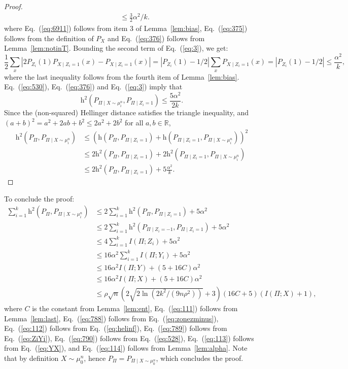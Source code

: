 \documentclass[final, 12pt]{colt2018}
\providecommand{\helli}{\mathrm{h}}
\renewcommand{\eqref}[1]{Eq.~(\ref{#1})}
\begin{document}
\begin{proof}
\begin{align}
&\le \frac{3}{2} \alpha^2 / k. \label{eq:376} 
\end{align}
where \eqref{eq:6911} follows from item 3 of Lemma~\ref{lem:bias}, \eqref{eq:375} follows from the definition of $P_X$ and \eqref{eq:376} follows from Lemma~\ref{lem:notinT}. Bounding the second term of \eqref{eq:3}, we get:
\begin{equation} \label{eq:530}
\frac{1}{2} \sum_{x} \left\lvert 2 P_{Z_i}(1) P_{X \mid Z_i = 1}(x) - P_{X \mid Z_i = 1}(x) \right\rvert
=\left\lvert P_{Z_i}(1)  - 1/2 \right\rvert \sum_{x} P_{X \mid Z_i = 1}(x)
=\left\lvert P_{Z_i}(1)  - 1/2 \right\rvert
\le \frac{\alpha^2}{k},
\end{equation}
where the last inequality follows from the fourth item of Lemma~\ref{lem:bias}. \eqref{eq:530}, \eqref{eq:376}  and \eqref{eq:3} imply that
\[
\helli^2\left( P_{\Pi \mid X \sim \mu_i^n}, P_{\Pi \mid Z_i = 1} \right) \le \frac{5\alpha^2}{2k}.
\]
Since the (non-squared) Hellinger distance satisfies the triangle inequality, and $(a+b)^2 = a^2 +2ab+ b^2 \le 2a^2 + 2b^2$ for all $a,b \in \mathbb{R}$,
\begin{align*}
\helli^2(P_{\Pi}, P_{\Pi \mid X \sim \mu_i^n})
&\le \left( \helli(P_{\Pi}, P_{\Pi \mid Z_i=1}) + 
\helli(P_{\Pi \mid Z_i = 1}, P_{\Pi \mid X \sim \mu_i^n}) \right)^2 \\
&\le 2 \helli^2(P_{\Pi}, P_{\Pi \mid Z_i=1}) 
+ 2 \helli^2(P_{\Pi \mid Z_i = 1}, P_{\Pi \mid X \sim \mu_i^n})\\
&\le 2 \helli^2(P_{\Pi}, P_{\Pi \mid Z_i=1}) 
+ 5 \frac{\alpha^2}{k}.
\end{align*}
\end{proof}

To conclude the proof:
\begin{align}
\sum_{i=1}^k \helli^2\left( P_{\Pi}, P_{\Pi \mid X \sim \mu_i^n} \right) 
&\le 2 \sum_{i=1}^k \helli^2\left( P_{\Pi}, P_{\Pi \mid Z_i=1} \right) + 5 \alpha^2 \label{eq:111} \\
&\le 2 \sum_{i=1}^k \helli^2(P_{\Pi \mid Z_i=-1}, P_{\Pi \mid Z_i=1}) + 5 \alpha^2 \label{eq:788} \\
&\le 4\sum_{i=1}^k I(\Pi; Z_i) + 5 \alpha^2 \label{eq:112} \\
&\le 16 \alpha^2 \sum_{i=1}^k I(\Pi; Y_i) + 5 \alpha^2 \label{eq:789} \\
&\le 16 \alpha^2 I(\Pi; Y) + (5 + 16 C) \alpha^2 \label{eq:790} \\
&\le 16 \alpha^2 I(\Pi; X) + (5 + 16 C) \alpha^2 \label{eq:113} \\
&\le \rho \sqrt{n} \left( 2 \sqrt{2\ln(2k^2/(9n \rho^2))} + 3 \right) (16C + 5) (I(\Pi; X) + 1) \label{eq:114},
\end{align}
where $C$ is the constant from Lemma~\ref{lem:ent}, \eqref{eq:111} follows from Lemma~\ref{lem:last}, \eqref{eq:788} follows from \eqref{eq:zonezminus},
\eqref{eq:112} follows from \eqref{eq:helinf}, \eqref{eq:789} follows from \eqref{eq:ZiYi}, \eqref{eq:790} follows from \eqref{eq:528}, \eqref{eq:113} follows from \eqref{eq:YX}, and \eqref{eq:114} follows from Lemma~\ref{lem:alpha}.
Note that by definition $X \sim \mu_0^n$, hence $P_{\Pi} = P_{\Pi \mid X \sim \mu_0^n}$, which concludes the proof.
\end{document}
